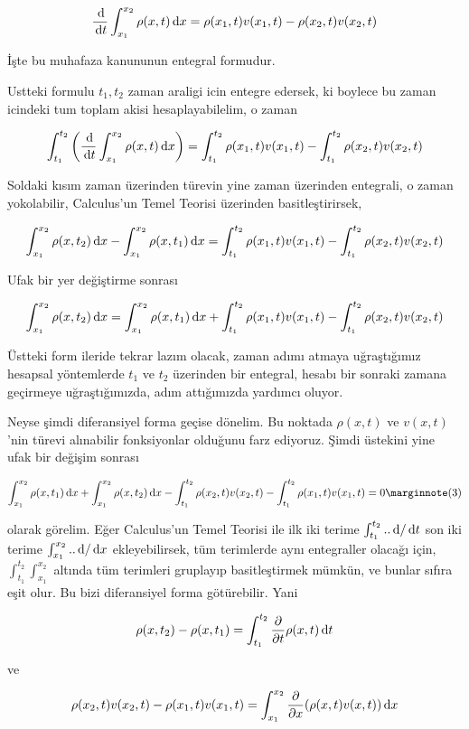 \documentclass[12pt,fleqn]{article}\usepackage{../../common}
\begin{document}
$$
\frac{\,\mathrm{d}}{\,\mathrm{d} t} \int _{x_1}^{x_2} \rho(x,t) \,\mathrm{d} x =
\rho(x_1,t) v(x_1,t) - \rho(x_2,t) v(x_2,t)
$$

İşte bu muhafaza kanununun entegral formudur. 

Ustteki formulu $t_1,t_2$ zaman araligi icin entegre edersek, ki boylece
bu zaman icindeki tum toplam akisi hesaplayabilelim, o zaman

$$
\int_{t_1}^{t_2} \left( \frac{\,\mathrm{d}}{\,\mathrm{d} t} \int _{x_1}^{x_2} \rho(x,t) \,\mathrm{d} x  \right)  =
\int_{t_1}^{t_2} \rho(x_1,t) v(x_1,t) - \int_{t_1}^{t_2}  \rho(x_2,t) v(x_2,t) 
$$

Soldaki kısım zaman üzerinden türevin yine zaman üzerinden entegrali, o zaman
yokolabilir, Calculus'un Temel Teorisi üzerinden basitleştirirsek,

$$
\int _{x_1}^{x_2} \rho(x,t_2) \,\mathrm{d} x - \int _{x_1}^{x_2} \rho(x,t_1) \,\mathrm{d} x  = 
\int_{t_1}^{t_2} \rho(x_1,t) v(x_1,t) - \int_{t_1}^{t_2}  \rho(x_2,t) v(x_2,t) 
$$

Ufak bir yer değiştirme sonrası

$$
\int _{x_1}^{x_2} \rho(x,t_2) \,\mathrm{d} x =
\int _{x_1}^{x_2} \rho(x,t_1) \,\mathrm{d} x  +
\int_{t_1}^{t_2} \rho(x_1,t) v(x_1,t) -
\int_{t_1}^{t_2}  \rho(x_2,t) v(x_2,t) 
$$

Üstteki form ileride tekrar lazım olacak, zaman adımı atmaya uğraştığımız
hesapsal yöntemlerde $t_1$ ve $t_2$ üzerinden bir entegral, hesabı bir sonraki
zamana geçirmeye uğraştığımızda, adım attığımızda yardımcı oluyor.

Neyse şimdi diferansiyel forma geçise dönelim. Bu noktada $\rho(x,t)$ ve
$v(x,t)$'nin türevi alınabilir fonksiyonlar olduğunu farz ediyoruz. Şimdi
üstekini yine ufak bir değişim sonrası

$$
\int _{x_1}^{x_2} \rho(x,t_1) \ud x  +
\int _{x_1}^{x_2} \rho(x,t_2) \ud x -
\int_{t_1}^{t_2}  \rho(x_2,t) v(x_2,t) -
\int_{t_1}^{t_2} \rho(x_1,t) v(x_1,t) = 0
\mlabel{3}
$$

olarak görelim. Eğer Calculus'un Temel Teorisi ile ilk iki terime
$\int_{t_1}^{t_2} .. \,\mathrm{d} / \,\mathrm{d} t$ son iki terime $\int_{x_1}^{x_2} .. \,\mathrm{d} / \,\mathrm{d} x$
ekleyebilirsek, tüm terimlerde aynı entegraller olacağı için, 
$\int_{t_1}^{t_2} \int_{x_1}^{x_2} $ altında tüm terimleri gruplayıp
basitleştirmek mümkün, ve bunlar sıfıra eşit olur. Bu bizi diferansiyel
forma götürebilir. Yani

$$
\rho(x,t_2) - \rho(x,t_1) = \int_{t_1}^{t_2}
\frac{\partial }{\partial t} \rho(x,t) \,\mathrm{d} t
$$

ve

$$
\rho(x_2,t)v(x_2,t) - \rho(x_1,t)v(x_1,t) =
\int _{x_1}^{x_2} \frac{\partial }{\partial x} (\rho(x,t)v(x,t)) \,\mathrm{d} x
$$
\end{document}
